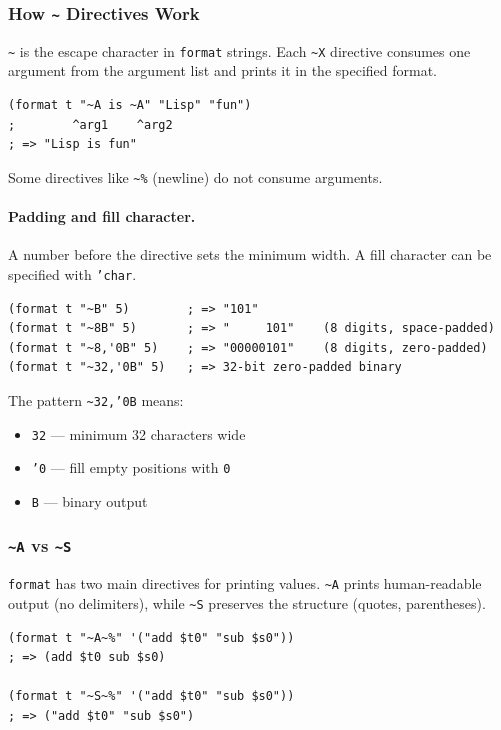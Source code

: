 \subsubsection{How \texttt{\~{}} Directives Work}

\texttt{\~{}} is the escape character in \texttt{format} strings.
Each \texttt{\~{}X} directive consumes one argument from the argument
list and prints it in the specified format.

\begin{lstlisting}
(format t "~A is ~A" "Lisp" "fun")
;        ^arg1    ^arg2
; => "Lisp is fun"
\end{lstlisting}

Some directives like \texttt{\~{}\%} (newline) do not consume arguments.

\paragraph{Padding and fill character.}

A number before the directive sets the minimum width.
A fill character can be specified with \texttt{'char}.

\begin{lstlisting}
(format t "~B" 5)        ; => "101"
(format t "~8B" 5)       ; => "     101"    (8 digits, space-padded)
(format t "~8,'0B" 5)    ; => "00000101"    (8 digits, zero-padded)
(format t "~32,'0B" 5)   ; => 32-bit zero-padded binary
\end{lstlisting}

The pattern \texttt{\~{}32,'0B} means:
\begin{itemize}
  \item \texttt{32} --- minimum 32 characters wide
  \item \texttt{'0} --- fill empty positions with \texttt{0}
  \item \texttt{B} --- binary output
\end{itemize}

\subsubsection{\texttt{\~{}A} vs \texttt{\~{}S}}

\texttt{format} has two main directives for printing values.
\texttt{\~{}A} prints human-readable output (no delimiters),
while \texttt{\~{}S} preserves the structure (quotes, parentheses).

\begin{lstlisting}
(format t "~A~%" '("add $t0" "sub $s0"))
; => (add $t0 sub $s0)

(format t "~S~%" '("add $t0" "sub $s0"))
; => ("add $t0" "sub $s0")
\end{lstlisting}

